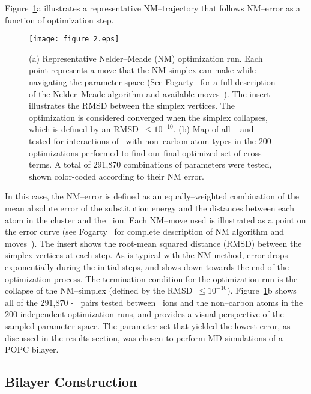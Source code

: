 Figure~\ref{figch2:nmerror}a illustrates a representative
NM--trajectory that follows NM--error as a function of optimization step. 
\begin{figure}[h!tb]
    \texttt{[image: figure\_2.eps]}
    \caption[Representative Nelder--Meade (NM) optimization run.]{(a) Representative Nelder--Meade (NM) optimization run. Each point
    represents a move that the NM simplex can make while navigating the parameter space 
    (See Fogarty \etal~for a full description of the
    Nelder--Meade algorithm and available moves~\cite{fogarty:2014:paropt}). The insert illustrates the 
    RMSD between the simplex vertices.
    The optimization is considered converged when the simplex collapses, which is defined by an RMSD~$\leq 10^{-10}$.
    (b) Map of all \sigmaij~ and \epsilonij~ tested for interactions of \na~with non--carbon atom types 
    in the 200 optimizations performed to find our final optimized set of cross terms. A total of
291,870 combinations of parameters were tested, shown color-coded according to their NM error.}
    \label{figch2:nmerror}
\end{figure}
In this case, the NM--error is
defined as an
equally--weighted combination of the mean absolute error of the
substitution energy and the distances between each atom in the cluster and the \na~ion. 
Each NM--move used is illustrated
as a point on the error curve 
(see Fogarty \etal~for complete description of NM algorithm and
moves~\cite{fogarty:2014:paropt}).
The insert shows the root-mean squared distance (RMSD) between the simplex vertices at each step. 
As is typical with the NM method, error drops exponentially during the
initial steps, and slows down towards the end of the optimization
process. The termination condition for the optimization run is the
collapse of the NM--simplex (defined by the RMSD~$\leq 10^{-10}$).
Figure~\ref{figch2:nmerror}b shows all of the 291,870 \sigmaij-\epsilonij~ pairs tested 
between \na~ions and the non--carbon atoms in the 200 independent optimization runs,
and provides a visual perspective of the sampled parameter space.
The parameter set that yielded the lowest error, as discussed in the results section, was
chosen to perform MD simulations of a POPC bilayer.

\subsection{Bilayer Construction}


